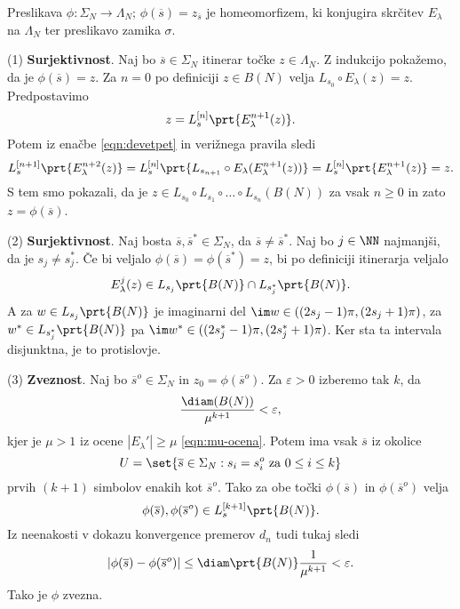 \begin{izrek}
    Preslikava \(\phi \colon \Sigma_N \to \Lambda_N\); \(\phi (\overline{s}) = z_{\overline{s}}\) je homeomorfizem, ki konjugira skrčitev \(E_\lambda\) na \(\Lambda_N\) ter preslikavo zamika \(\sigma\). 
\end{izrek}

\begin{dokaz}
    (1) \textbf{Surjektivnost}. Naj bo \(\overline{s} \in \Sigma_N\) itinerar točke \(z \in \Lambda_N\). Z indukcijo pokažemo, da je \(\phi (\overline{s}) = z\). Za \(n = 0\) po definiciji \(z \in B (N)\) velja \(L_{s_0} \circ E_\lambda (z) = z\). Predpostavimo
    \[z = L_{s}^{[n]} \prt{E_{\lambda}^{n + 1} (z)}.\]
    Potem iz enačbe \eqref{eqn:devetpet} in verižnega pravila sledi
    \[L_{s}^{[n + 1]} \prt{E_{\lambda}^{n + 2} (z)} = L_{s}^{[n]} \prt{L_{s_{n + 1}} \circ E_\lambda (E_\lambda^{n + 1} (z))} = L_{s}^{[n]} \prt{E_\lambda^{n + 1} (z)} = z.\]
    S tem smo pokazali, da je \(z \in L_{s_0} \circ L_{s_1} \circ \dots \circ L_{s_n} (B (N))\) za vsak \(n \geq 0\) in zato \(z = \phi (\overline{s})\).

    (2) \textbf{Surjektivnost}. Naj bosta \(\overline{s}, \overline{s}^* \in \Sigma_N\), da \(\overline{s} \neq \overline{s}^*\). Naj bo \(j \in \NN\) najmanjši, da je \(s_j \neq s_j^*\). Če bi veljalo \(\phi (\overline{s}) = \phi (\overline{s}^*) = z\), bi po definiciji itinerarja veljalo
    \[E_\lambda^j (z)\in L_{s_j} \prt{B (N)} \cap L_{s_j^*} \prt{B (N)}.\]
    A za \(w \in L_{s_j} \prt{B (N)}\) je imaginarni del \(\im w \in ((2 s_j - 1) \pi, (2 s_j + 1) \pi)\), za \(w^* \in L_{s_j^*} \prt{B (N)}\) pa \(\im w^* \in ((2 s_j^* - 1) \pi, (2 s_j^* + 1) \pi)\). Ker sta ta intervala disjunktna, je to protislovje.

    (3) \textbf{Zveznost}. Naj bo \(\overline{s}^o \in \Sigma_N\) in \(z_0 = \phi (\overline{s}^o)\). Za \(\varepsilon > 0\) izberemo tak \(k\), da
    \[\frac{\diam (B (N))}{\mu^{k + 1}} < \varepsilon,\]
    kjer je \(\mu > 1\) iz ocene \(|E_\lambda'| \geq \mu\) \eqref{eqn:mu-ocena}. Potem ima vsak \(\overline{s}\) iz okolice
    \[U = \set{\overline{s} \in \Sigma_N : s_i = s_i^o \text{ za } 0 \leq i \leq k}\]
    prvih \((k + 1)\) simbolov enakih kot \(\overline{s}^o\). Tako za obe točki \(\phi (\overline{s})\) in \(\phi (\overline{s}^o)\) velja
    \[\phi (\overline{s}), \phi (\overline{s}^o) \in L_s^{[k + 1]} \prt{B (N)}.\]
    Iz neenakosti v dokazu konvergence premerov \(d_n\) tudi tukaj sledi
    \[\left| \phi (\overline{s}) - \phi (\overline{s}^o) \right| \leq \diam \prt{B (N)} \frac{1}{\mu^{k + 1}} < \varepsilon.\]
    Tako je \(\phi\) zvezna.


\end{dokaz}
